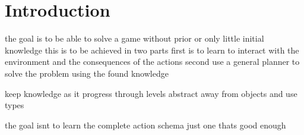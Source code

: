 \section{Introduction}
	the goal is to be able to solve a game without prior or only little initial knowledge
	this is to be achieved in two parts
	first is to learn to interact with the environment and the consequences of the actions 
	second use a general planner to solve the problem using the found knowledge
	
	keep knowledge as it progress through levels
	abstract away from objects and use types
	
	the goal isnt to learn the complete action schema just one thats good enough


%
%
%
